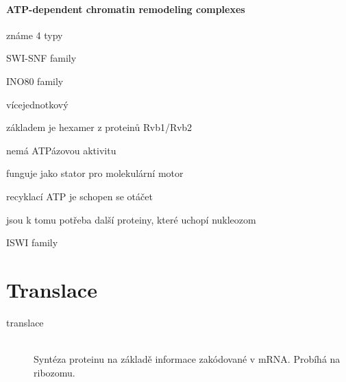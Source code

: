 \documentclass[DIV=8]{scrreprt}
\begin{document}
\paragraph{ATP-dependent chromatin remodeling complexes}
\begin{myItemize}[nosep]
    \item známe 4 typy
    \item SWI-SNF family
    \item INO80 family
\begin{myItemize}[nosep]
    \item vícejednotkový
    \item základem je hexamer z proteinů Rvb1/Rvb2
    \item nemá ATPázovou aktivitu
    \item funguje jako stator pro molekulární motor
\begin{myItemize}[nosep]
    \item recyklací ATP je schopen se otáčet
    \item jsou k tomu potřeba další proteiny, které uchopí nukleozom
\end{myItemize}

\end{myItemize}

    \item ISWI family
\end{myItemize}



\section{Translace} \label{Translace} \FloatBarrier


\begin{description}
\item[translace]\hfill \\
Syntéza proteinu na základě informace zakódované v mRNA. Probíhá na ribozomu.

\end{description}
\end{document}
